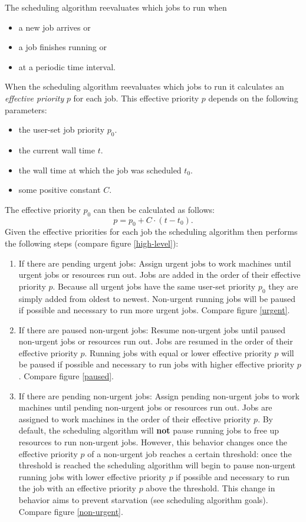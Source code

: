 The scheduling algorithm reevaluates which jobs to run when
\begin{itemize}
  \item a new job arrives or
  \item a job finishes running or
  \item at a periodic time interval.
\end{itemize}
When the scheduling algorithm reevaluates which jobs to run it calculates an \textit{effective priority} $p$ for each job.
This effective priority $p$ depends on the following parameters:
\begin{itemize}
  \item the user-set job priority $p_0$.
  \item the current wall time $t$.
  \item the wall time at which the job was scheduled $t_0$.
  \item some positive constant $C$.
\end{itemize}
The effective priority $p_0$ can then be calculated as follows:
\begin{equation}
p = p_0 + C \cdot (t - t_0).
\end{equation}
Given the effective priorities for each job the scheduling algorithm then performs the following steps (compare figure \ref{high-level}):
\begin{enumerate}
  \item If there are pending urgent jobs:
  Assign urgent jobs to work machines until urgent jobs or resources run out.
  Jobs are added in the order of their effective priority $p$.
  Because all urgent jobs have the same user-set priority $p_0$ they are simply added from oldest to newest.
  Non-urgent running jobs will be paused if possible and necessary to run more urgent jobs.
  Compare figure \ref{urgent}.
  \item If there are paused non-urgent jobs:
  Resume non-urgent jobs until paused non-urgent jobs or resources run out.
  Jobs are resumed in the order of their effective priority $p$.
  Running jobs with equal or lower effective priority $p$ will be paused if possible and necessary to run jobs with higher effective priority $p$.
  Compare figure \ref{paused}.
  \item If there are pending non-urgent jobs:
  Assign pending non-urgent jobs to work machines until pending non-urgent jobs or resources run out.
  Jobs are assigned to work machines in the order of their effective priority $p$.
  By default, the scheduling algorithm will \textbf{not} pause running jobs to free up resources to run non-urgent jobs.
  However, this behavior changes once the effective priority $p$ of a non-urgent job reaches a certain threshold:
  once the threshold is reached the scheduling algorithm will begin to pause non-urgent running jobs with lower effective priority $p$ if possible and necessary to run the job with an effective priority $p$ above the threshold.
  This change in behavior aims to prevent starvation (see scheduling algorithm goals).
  Compare figure \ref{non-urgent}.
\end{enumerate}
